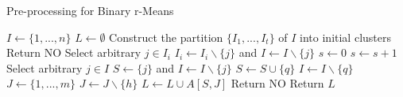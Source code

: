 \begin{algorithm}[H]
    \caption{Pre-processing for Binary r-Means}
    \label{kernel}
    \begin{algorithmic}[1]
            \State $I \gets \{1,...,n\}$
            \State $L \gets \emptyset$
            \State Construct the partition $\{I_1,...,I_t\}$ of $I$ into initial clusters
                \State Return NO
            \Else
                        \State Select arbitrary $j \in I_i$
                        \State $I_i \gets I_i \backslash \{j\}$ and $I \gets I \backslash \{j\}$
                    \EndWhile
                \EndFor
                \State $s \gets 0$
                    \State $s \gets s+1$
                    \State Select arbitrary $j \in I$
                    \State $S \gets \{j\}$ and $I \gets I \backslash \{j\}$
                        \State $S \gets S \cup \{q\}$
                        \State $I \gets I \backslash \{q\}$
                    \EndWhile
                    \State $J \gets \{1,...,m\}$
                        \State $J \gets J \backslash \{h\}$
                    \EndWhile
                    \State $L \gets L \cup A[S,J]$
                \EndWhile
            \EndIf
                \State Return NO
            \Else
                \State Return $L$
            \EndIf
        \EndProcedure
    \end{algorithmic}
\end{algorithm}